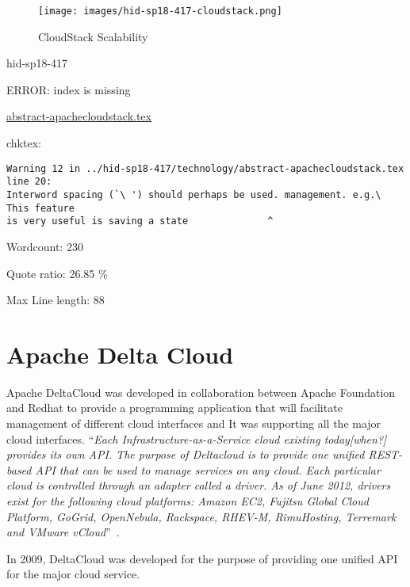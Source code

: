 \begin{figure}[htb]
\texttt{[image: images/hid-sp18-417-cloudstack.png]}
\caption{CloudStack Scalability~\cite{hid-sp18-417-cloudstack-scaling}}
\label{F:cloudstack-scalabuility}
\end{figure}


\begin{IU}

hid-sp18-417

ERROR: index is missing

\href{https://github.com/cloudmesh-community/hid-sp18-417/blob/master//technology/abstract-apachecloudstack.tex}{abstract-apachecloudstack.tex}

 
chktex:
\begin{tiny}
\begin{verbatim}
Warning 12 in ../hid-sp18-417/technology/abstract-apachecloudstack.tex line 20:
Interword spacing (`\ ') should perhaps be used. management. e.g.\ This feature
is very useful is saving a state              ^
\end{verbatim}
\end{tiny}

Wordcount: 230


Quote ratio: 26.85 \%
 
Max Line length: 88
\end{IU}

\section{Apache Delta Cloud}

Apache DeltaCloud was developed in collaboration between Apache
Foundation and Redhat to provide a programming application that will
facilitate management of different cloud interfaces and It was
supporting all the major cloud interfaces.  \color{blue}``\emph{Each
Infrastructure-as-a-Service cloud existing today[when?] provides its
own API. The purpose of Deltacloud is to provide one unified
REST-based API that can be used to manage services on any cloud. Each
particular cloud is controlled through an adapter called a
\textit{driver}. As of June 2012, drivers exist for the following
cloud platforms: Amazon EC2, Fujitsu Global Cloud Platform, GoGrid,
OpenNebula, Rackspace, RHEV-M, RimuHosting, Terremark and VMware
vCloud}''\color{black}~\cite{hid-sp18-417-wiki-deltacloud}.

In 2009, DeltaCloud was developed for the purpose of providing one
unified API for the major cloud service.

